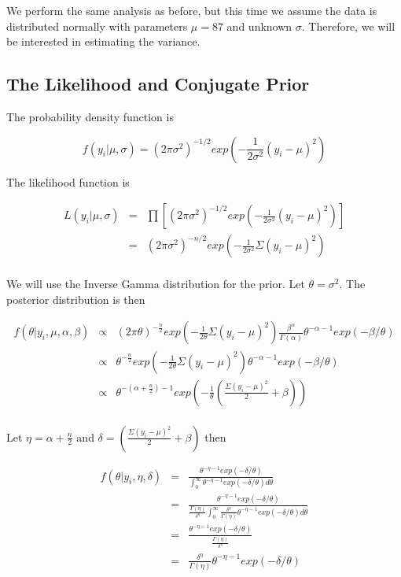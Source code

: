 \documentclass[12pt]{article}
\begin{document}
\noindent We perform the same analysis as before, but this time we assume the data is distributed normally with parameters $\mu=87$ and unknown $\sigma$.  Therefore, we will be interested in estimating the variance.

\subsection{The Likelihood and Conjugate Prior}

\noindent The probability density function is

\[f(y_i|\mu,\sigma)=(2\pi\sigma^2)^{-1/2}exp\left(-\frac{1}{2\sigma^2}(y_i-\mu)^2\right)\]

\noindent The likelihood function is

\begin{eqnarray*}
L(y_i|\mu,\sigma) &=& \prod\left[(2\pi\sigma^2)^{-1/2}exp\left(-\frac{1}{2\sigma^2}(y_i-\mu)^2\right)\right] \\
&=& (2\pi\sigma^2)^{-n/2}exp\left(-\frac{1}{2\sigma^2}\Sigma(y_i-\mu)^2\right) \\
\end{eqnarray*}

\noindent We will use the Inverse Gamma distribution for the prior.  Let $\theta=\sigma^2$.  The posterior distribution is then

\begin{eqnarray*}
f(\theta|y_i,\mu,\alpha,\beta) &\propto& (2\pi\theta)^{-\frac{n}{2}}exp\left(-\frac{1}{2\theta}\Sigma(y_i-\mu)^2\right)\frac{\beta^\alpha}{\Gamma(\alpha)}\theta^{-\alpha-1}exp(-\beta/\theta) \\
&\propto& \theta^{-\frac{n}{2}}exp\left(-\frac{1}{2\theta}\Sigma(y_i-\mu)^2\right)\theta^{-\alpha-1}exp(-\beta/\theta) \\
&\propto& \theta^{-(\alpha+\frac{n}{2})-1}exp\left(-\frac{1}{\theta}\left(\frac{\Sigma(y_i-\mu)^2}{2}+\beta\right)\right) \\
\end{eqnarray*}

\noindent Let $\eta=\alpha+\frac{n}{2}$ and $\delta=\left(\frac{\Sigma(y_i-\mu)^2}{2}+\beta\right)$ then

\begin{eqnarray*}
f(\theta|y_i,\eta,\delta) &=& \frac{\theta^{-\eta-1}exp(-\delta/\theta)}{\int_0^\infty\theta^{-\eta-1}exp(-\delta/\theta)d\theta} \\
&=& \frac{\theta^{-\eta-1}exp(-\delta/\theta)}{\frac{\Gamma(\eta)}{\delta^\eta}\int_0^\infty\frac{\delta^\eta}{\Gamma(\eta)}\theta^{-\eta-1}exp(-\delta/\theta)d\theta} \\
&=& \frac{\theta^{-\eta-1}exp(-\delta/\theta)}{\frac{\Gamma(\eta)}{\delta^\eta}} \\
&=& \frac{\delta^\eta}{\Gamma(\eta)}\theta^{-\eta-1}exp(-\delta/\theta) \\
\end{eqnarray*}
\end{document}
